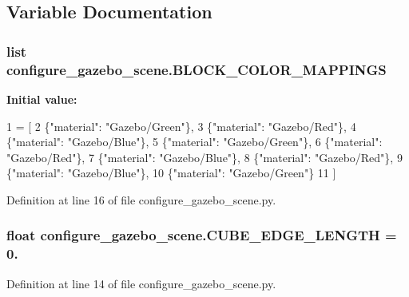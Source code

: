 \subsection{Variable Documentation}
\subsubsection[{\texorpdfstring{B\+L\+O\+C\+K\+\_\+\+C\+O\+L\+O\+R\+\_\+\+M\+A\+P\+P\+I\+N\+GS}{BLOCK_COLOR_MAPPINGS}}]{\setlength{\rightskip}{0pt plus 5cm}list configure\+\_\+gazebo\+\_\+scene.\+B\+L\+O\+C\+K\+\_\+\+C\+O\+L\+O\+R\+\_\+\+M\+A\+P\+P\+I\+N\+GS}\hypertarget{namespaceconfigure__gazebo__scene_af8cc2d588a02690aa6e82b403bb9a645}{}\label{namespaceconfigure__gazebo__scene_af8cc2d588a02690aa6e82b403bb9a645}
{\bfseries Initial value\+:}
\begin{DoxyCode}
1 = [
2     \{\textcolor{stringliteral}{"material"}: \textcolor{stringliteral}{"Gazebo/Green"}\},
3     \{\textcolor{stringliteral}{"material"}: \textcolor{stringliteral}{"Gazebo/Red"}\},
4     \{\textcolor{stringliteral}{"material"}: \textcolor{stringliteral}{"Gazebo/Blue"}\},
5     \{\textcolor{stringliteral}{"material"}: \textcolor{stringliteral}{"Gazebo/Green"}\},
6     \{\textcolor{stringliteral}{"material"}: \textcolor{stringliteral}{"Gazebo/Red"}\},
7     \{\textcolor{stringliteral}{"material"}: \textcolor{stringliteral}{"Gazebo/Blue"}\},
8     \{\textcolor{stringliteral}{"material"}: \textcolor{stringliteral}{"Gazebo/Red"}\},
9     \{\textcolor{stringliteral}{"material"}: \textcolor{stringliteral}{"Gazebo/Blue"}\},
10     \{\textcolor{stringliteral}{"material"}: \textcolor{stringliteral}{"Gazebo/Green"}\}
11 ]
\end{DoxyCode}


Definition at line 16 of file configure\+\_\+gazebo\+\_\+scene.\+py.

\subsubsection[{\texorpdfstring{C\+U\+B\+E\+\_\+\+E\+D\+G\+E\+\_\+\+L\+E\+N\+G\+TH}{CUBE_EDGE_LENGTH}}]{\setlength{\rightskip}{0pt plus 5cm}float configure\+\_\+gazebo\+\_\+scene.\+C\+U\+B\+E\+\_\+\+E\+D\+G\+E\+\_\+\+L\+E\+N\+G\+TH = 0.}\hypertarget{namespaceconfigure__gazebo__scene_afb3c90e32ac162e99a711bd0a8fe03ac}{}\label{namespaceconfigure__gazebo__scene_afb3c90e32ac162e99a711bd0a8fe03ac}


Definition at line 14 of file configure\+\_\+gazebo\+\_\+scene.\+py.

